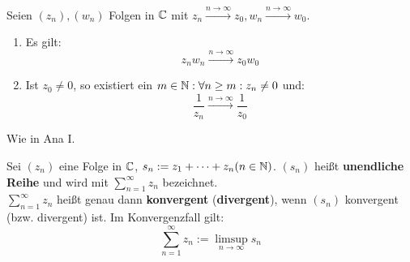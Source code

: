 \documentclass[a4paper,oneside,DIV15,BCOR12mm,chapterprefix=true,headings=onelinechapter]{scrbook}
\begin{document}
\begin{satz}
Seien $(z_n),(w_n)$ Folgen in $\mathbb{C}$ mit $z_n\stackrel{n\to\infty}{\to}z_0,
w_n\stackrel{n\to\infty}{\to}w_0$.
\begin{enumerate}
\item Es gilt:
\[z_nw_n\stackrel{n\to\infty}{\to}z_0w_0\]
\item Ist $z_0\ne 0$, so existiert ein $m\in\mathbb{N}:\forall n\ge m:z_n\ne 0$ und:
\[\frac1{z_n}\stackrel{n\to\infty}{\to}\frac1{z_0}\]
\end{enumerate}
\end{satz}

\begin{beweis}
Wie in Ana I.
\end{beweis}

\begin{definition}
Sei $(z_n)$ eine Folge in $\mathbb{C}$, $s_n:=z_1+\cdots+z_n (n\in\mathbb{N})$. $(s_n)$ heißt
\textbf{unendliche Reihe} und wird mit $\sum_{n=1}^{\infty} z_n$ bezeichnet.\\
$\sum_{n=1}^{\infty} z_n$ heißt genau dann \textbf{konvergent} (\textbf{divergent}),
wenn $(s_n)$ konvergent (bzw. divergent) ist. Im Konvergenzfall gilt:
\[\sum_{n=1}^{\infty} z_n:=\limsup_{n\to\infty} s_n\]
\end{definition}
\end{document}
